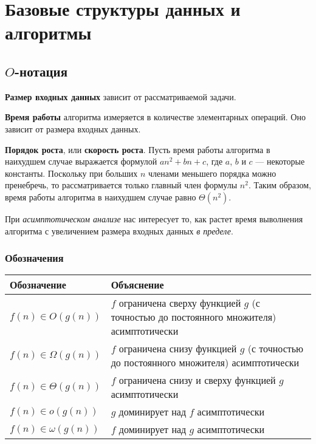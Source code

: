 \chapter{Базовые структуры данных и алгоритмы}
\label{ch:basic-ds}

\section{$O$-нотация}
\label{sec:o-notation}

\textbf{Размер входных данных} зависит от рассматриваемой задачи.

\textbf{Время работы} алгоритма измеряется в количестве элементарных операций. Оно зависит от размера входных данных.

\textbf{Порядок роста}, или \textbf{скорость роста}. Пусть время работы алгоритма в наихудшем случае выражается формулой $an^2 + bn + c$, где $a$, $b$ и $c$ --- некоторые константы. Поскольку при больших $n$ членами меньшего порядка можно пренебречь, то рассматривается только главный член формулы $n^2$. Таким образом, время работы алгоритма в наихудшем случае равно $\Theta(n^2)$.

При \emph{асимптотическом анализе} нас интересует то, как растет время выволнения алгоритма с увеличением размера входных данных \emph{в пределе}.

\subsection{Обозначения}
\begin{tabular}{lp{11cm}}
  \toprule
  Обозначение & Объяснение \\
  \midrule
  $f(n) \in O(g(n))$ & $f$ ограничена сверху функцией $g$ (с точностью до постоянного множителя) асимптотически \\
  $f(n) \in \Omega(g(n))$ & $f$ ограничена снизу функцией $g$ (с точностью до постоянного множителя) асимптотически \\
  $f(n) \in \Theta(g(n))$ & $f$ ограничена снизу и сверху функцией $g$ асимптотически \\
  $f(n) \in o(g(n))$ & $g$ доминирует над $f$ асимптотически \\
  $f(n) \in \omega(g(n))$ & $f$ доминирует над $g$ асимптотически \\
  \bottomrule
\end{tabular}

